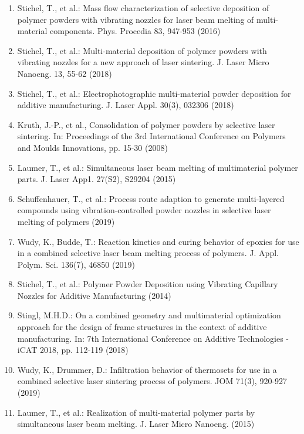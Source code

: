 \documentclass[10pt]{article}
\begin{document}
\begin{enumerate}
  \item Stichel, T., et al.: Mass flow characterization of selective deposition of polymer powders with vibrating nozzles for laser beam melting of multi-material components. Phys. Procedia 83, 947-953 (2016)

  \item Stichel, T., et al.: Multi-material deposition of polymer powders with vibrating nozzles for a new approach of laser sintering. J. Laser Micro Nanoeng. 13, 55-62 (2018)

  \item Stichel, T., et al.: Electrophotographic multi-material powder deposition for additive manufacturing. J. Laser Appl. 30(3), 032306 (2018)

  \item Kruth, J.-P., et al., Consolidation of polymer powders by selective laser sintering. In: Proceedings of the 3rd International Conference on Polymers and Moulds Innovations, pp. 15-30 (2008)

  \item Laumer, T., et al.: Simultaneous laser beam melting of multimaterial polymer parts. J. Laser App1. 27(S2), S29204 (2015)

  \item Schuffenhauer, T., et al.: Process route adaption to generate multi-layered compounds using vibration-controlled powder nozzles in selective laser melting of polymers (2019)

  \item Wudy, K., Budde, T.: Reaction kinetics and curing behavior of epoxies for use in a combined selective laser beam melting process of polymers. J. Appl. Polym. Sci. 136(7), 46850 (2019)

  \item Stichel, T., et al.: Polymer Powder Deposition using Vibrating Capillary Nozzles for Additive Manufacturing (2014)

  \item Stingl, M.H.D.: On a combined geometry and multimaterial optimization approach for the design of frame structures in the context of additive manufacturing. In: 7th International Conference on Additive Technologies - iCAT 2018, pp. 112-119 (2018)

  \item Wudy, K., Drummer, D.: Infiltration behavior of thermosets for use in a combined selective laser sintering process of polymers. JOM 71(3), 920-927 (2019)

  \item Laumer, T., et al.: Realization of multi-material polymer parts by simultaneous laser beam melting. J. Laser Micro Nanoeng. (2015)

\end{enumerate}
\end{document}
